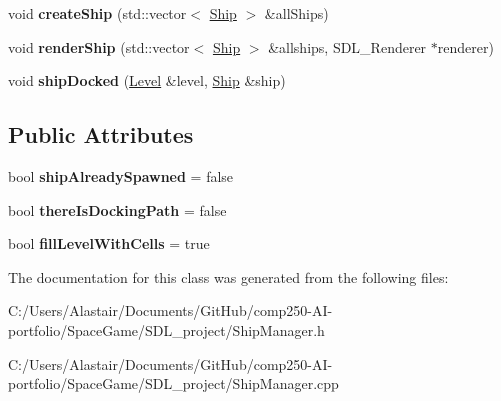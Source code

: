 \begin{DoxyCompactItemize}
\item 
\mbox{\label{class_ship_manager_a2a48ef5e8de1d665890fce631b652738}} 
void {\bfseries create\+Ship} (std\+::vector$<$ \hyperlink{class_ship}{Ship} $>$ \&all\+Ships)
\item 
\mbox{\label{class_ship_manager_a4592885107ee1ebf4b67e09c21e0cd19}} 
void {\bfseries render\+Ship} (std\+::vector$<$ \hyperlink{class_ship}{Ship} $>$ \&allships, S\+D\+L\+\_\+\+Renderer $\ast$renderer)
\item 
\mbox{\label{class_ship_manager_a6153e9fc458598fde00bde88f8e4a97f}} 
void {\bfseries ship\+Docked} (\hyperlink{class_level}{Level} \&level, \hyperlink{class_ship}{Ship} \&ship)
\end{DoxyCompactItemize}
\subsection*{Public Attributes}
\begin{DoxyCompactItemize}
\item 
\mbox{\label{class_ship_manager_a95b1e086a0869f8710eb08f34361a265}} 
bool {\bfseries ship\+Already\+Spawned} = false
\item 
\mbox{\label{class_ship_manager_a94034b450484f60571f2a5adbe598367}} 
bool {\bfseries there\+Is\+Docking\+Path} = false
\item 
\mbox{\label{class_ship_manager_a28167f646696e508c96ee8272bbfbc12}} 
bool {\bfseries fill\+Level\+With\+Cells} = true
\end{DoxyCompactItemize}


The documentation for this class was generated from the following files\+:\begin{DoxyCompactItemize}
\item 
C\+:/\+Users/\+Alastair/\+Documents/\+Git\+Hub/comp250-\/\+A\+I-\/portfolio/\+Space\+Game/\+S\+D\+L\+\_\+project/Ship\+Manager.\+h\item 
C\+:/\+Users/\+Alastair/\+Documents/\+Git\+Hub/comp250-\/\+A\+I-\/portfolio/\+Space\+Game/\+S\+D\+L\+\_\+project/Ship\+Manager.\+cpp\end{DoxyCompactItemize}
